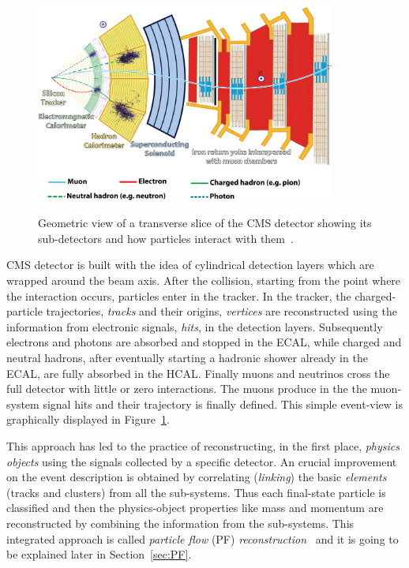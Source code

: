 \begin{figure}[h]
\centering
\includegraphics[width=0.88\textwidth]{Figures/c2/CMSslice.png}\\
\caption{Geometric view of a transverse slice of the CMS detector showing its sub-detectors and how particles interact with them~\cite{Barney:2120661}.}
\label{fig:cmsslice}
\end{figure} 
CMS detector is built with the idea of cylindrical detection layers
which are wrapped around the beam axis. After the collision, starting
from the point where the interaction occurs, particles enter in the
tracker. In the tracker, the charged-particle trajectories, \emph{tracks}
and their origins, \emph{vertices} are reconstructed using the information from
electronic signals, \emph{hits}, in the detection layers. Subsequently
electrons and photons are absorbed and stopped in the ECAL, while
charged and neutral hadrons, after eventually starting a hadronic
shower already in the ECAL, are fully absorbed in the HCAL. Finally muons and neutrinos cross
the full detector with little or zero interactions. The muons 
produce in the the muon-system signal hits and their trajectory is finally defined. This simple
event-view is graphically displayed in Figure~\ref{fig:cmsslice}.


This approach has led to the practice of reconstructing, in the first place, \emph{physics
objects} using the signals collected by a specific
detector.
An crucial improvement on the event description is obtained by
correlating (\emph{linking}) the basic \emph{elements} (\ie tracks and
clusters) from all the sub-systems. Thus each final-state
particle is classified and then the physics-object properties like
mass and momentum are reconstructed by combining the information from
the sub-systems. This
integrated approach is called \emph{particle flow} (PF)
\emph{reconstruction}~\cite{CMS:particleflow} and it is going to be
explained later in Section~\ref{sec:PF}.

